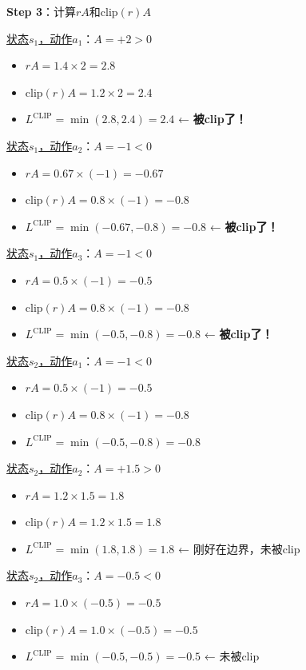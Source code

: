 \documentclass[11pt,a4paper]{article}
\theoremstyle{definition}
\begin{document}
\begin{calculation}
\textbf{Step 3}：计算$rA$和$\text{clip}(r)A$

\underline{状态$s_1$，动作$a_1$}：$A = +2 > 0$
\begin{itemize}
    \item $rA = 1.4 \times 2 = 2.8$
    \item $\text{clip}(r)A = 1.2 \times 2 = 2.4$
    \item $L^{\text{CLIP}} = \min(2.8, 2.4) = 2.4$ ← \textbf{被clip了！}
\end{itemize}

\underline{状态$s_1$，动作$a_2$}：$A = -1 < 0$
\begin{itemize}
    \item $rA = 0.67 \times (-1) = -0.67$
    \item $\text{clip}(r)A = 0.8 \times (-1) = -0.8$
    \item $L^{\text{CLIP}} = \min(-0.67, -0.8) = -0.8$ ← \textbf{被clip了！}
\end{itemize}

\underline{状态$s_1$，动作$a_3$}：$A = -1 < 0$
\begin{itemize}
    \item $rA = 0.5 \times (-1) = -0.5$
    \item $\text{clip}(r)A = 0.8 \times (-1) = -0.8$
    \item $L^{\text{CLIP}} = \min(-0.5, -0.8) = -0.8$ ← \textbf{被clip了！}
\end{itemize}

\underline{状态$s_2$，动作$a_1$}：$A = -1 < 0$
\begin{itemize}
    \item $rA = 0.5 \times (-1) = -0.5$
    \item $\text{clip}(r)A = 0.8 \times (-1) = -0.8$
    \item $L^{\text{CLIP}} = \min(-0.5, -0.8) = -0.8$
\end{itemize}

\underline{状态$s_2$，动作$a_2$}：$A = +1.5 > 0$
\begin{itemize}
    \item $rA = 1.2 \times 1.5 = 1.8$
    \item $\text{clip}(r)A = 1.2 \times 1.5 = 1.8$
    \item $L^{\text{CLIP}} = \min(1.8, 1.8) = 1.8$ ← 刚好在边界，未被clip
\end{itemize}

\underline{状态$s_2$，动作$a_3$}：$A = -0.5 < 0$
\begin{itemize}
    \item $rA = 1.0 \times (-0.5) = -0.5$
    \item $\text{clip}(r)A = 1.0 \times (-0.5) = -0.5$
    \item $L^{\text{CLIP}} = \min(-0.5, -0.5) = -0.5$ ← 未被clip
\end{itemize}


\end{calculation}
\end{document}
